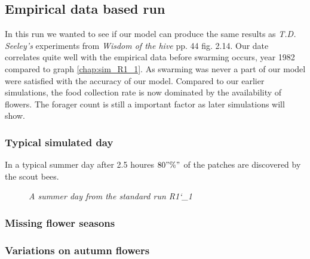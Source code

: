 	\subsection{Empirical data based run}
	In this run we wanted to see if our model can produce the same results as \textit{T.D. Seeley's} experiments from \textit{Wisdom of the hive} pp. 44 fig. 2.14. Our date correlates quite well with the empirical data before swarming occurs, year 1982 compared to graph \ref{chap:sim_R1_1}. As swarming was never a part of our model were satisfied with the accuracy of our model.
	Compared to our earlier simulations, the food collection rate is now dominated by the availability of flowers. The forager count is still a important factor as later simulations will show.
	
	\subsubsection{Typical simulated day}
	In a typical summer day after 2.5 houres $80"\%"$ of the patches are discovered by the scout bees.
		
		\begin{figure}[H]
			\centering
			\caption{\textit{A summer day from the standard run R1\char`_1}}
			\label{fig:day158}
		\end{figure}
	 
	\subsubsection{Missing flower seasons}
	\subsubsection{Variations on autumn flowers}
	
